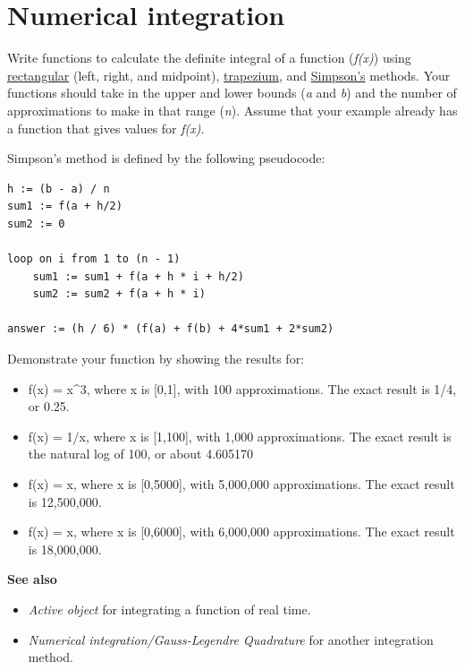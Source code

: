\pagebreak{}
\section*{Numerical integration}

Write functions to calculate the definite integral of a function
(\emph{f(x)}) using
\href{http://en.wikipedia.org/wiki/Rectangle\_method}{rectangular}
(left, right, and midpoint),
\href{http://en.wikipedia.org/wiki/Trapezoidal\_rule}{trapezium}, and
\href{http://en.wikipedia.org/wiki/Simpson\%27s\_rule}{Simpson's}
methods. Your functions should take in the upper and lower bounds
(\emph{a} and \emph{b}) and the number of approximations to make in that
range (\emph{n}). Assume that your example already has a function that
gives values for \emph{f(x)}.

Simpson's method is defined by the following pseudocode:

\begin{verbatim}
h := (b - a) / n
sum1 := f(a + h/2)
sum2 := 0

loop on i from 1 to (n - 1)
    sum1 := sum1 + f(a + h * i + h/2)
    sum2 := sum2 + f(a + h * i)

answer := (h / 6) * (f(a) + f(b) + 4*sum1 + 2*sum2)
\end{verbatim}

Demonstrate your function by showing the results for:

\begin{itemize}
\item
  f(x) = x\^{}3, where x is {[}0,1{]}, with 100 approximations. The
  exact result is 1/4, or 0.25.
\item
  f(x) = 1/x, where x is {[}1,100{]}, with 1,000 approximations. The
  exact result is the natural log of 100, or about 4.605170
\item
  f(x) = x, where x is {[}0,5000{]}, with 5,000,000 approximations. The
  exact result is 12,500,000.
\item
  f(x) = x, where x is {[}0,6000{]}, with 6,000,000 approximations. The
  exact result is 18,000,000.
\end{itemize}

\textbf{See also}

\begin{itemize}
\item
  \emph{Active object} for integrating a function
  of real time.
\item
  \emph{Numerical
  integration/Gauss-Legendre Quadrature} for another integration method.
\end{itemize}



